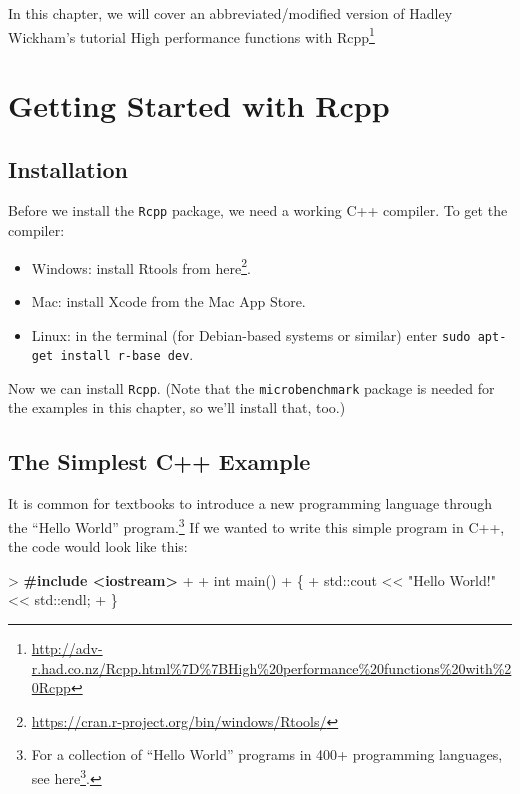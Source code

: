\documentclass[
]{krantz}
\makeatletter
\newenvironment{Shaded}{\begin{snugshade}}{\end{snugshade}}
\newcommand{\BuiltInTok}[1]{#1}
\newcommand{\DataTypeTok}[1]{\textcolor[rgb]{0.27,0.27,0.27}{#1}}
\newcommand{\ErrorTok}[1]{\textcolor[rgb]{0.14,0.14,0.14}{\textbf{#1}}}
\newcommand{\NormalTok}[1]{#1}
\newcommand{\StringTok}[1]{\textcolor[rgb]{0.5,0.5,0.5}{#1}}
\providecommand{\tightlist}{%
  \setlength{\itemsep}{0pt}\setlength{\parskip}{0pt}}
\renewcommand{\href}[2]{#2\footnote{\url{#1}}}
\newenvironment{kframe}{%
\medskip{}
\setlength{\fboxsep}{.8em}
 \def\at@end@of@kframe{}%
 \ifinner\ifhmode%
  \def\at@end@of@kframe{\end{minipage}}%
  \begin{minipage}{\columnwidth}%
 \fi\fi%
 \def\FrameCommand##1{\hskip\@totalleftmargin \hskip-\fboxsep
 \colorbox{shadecolor}{##1}\hskip-\fboxsep
     \hskip-\linewidth \hskip-\@totalleftmargin \hskip\columnwidth}%
 \MakeFramed {\advance\hsize-\width
   \@totalleftmargin\z@ \linewidth\hsize
   \@setminipage}}%
 {\par\unskip\endMakeFramed%
 \at@end@of@kframe}
\renewenvironment{Shaded}{\begin{kframe}}{\end{kframe}}
\makeatother
\begin{document}
In this chapter, we will cover an abbreviated/modified version of Hadley Wickham's tutorial \href{http://adv-r.had.co.nz/Rcpp.html\%7D\%7BHigh\%20performance\%20functions\%20with\%20Rcpp}{High performance functions with Rcpp}

\hypertarget{getting-started-with-rcpp}{%
\section{Getting Started with Rcpp}\label{getting-started-with-rcpp}}

\hypertarget{installation}{%
\subsection{Installation}\label{installation}}

Before we install the \texttt{Rcpp} package, we need a working C++ compiler. To get the compiler:

\begin{itemize}
\tightlist
\item
  Windows: install Rtools from \href{https://cran.r-project.org/bin/windows/Rtools/}{here}.
\item
  Mac: install Xcode from the Mac App Store.
\item
  Linux: in the terminal (for Debian-based systems or similar) enter
  \texttt{sudo\ apt-get\ install\ r-base\ dev}.
\end{itemize}

Now we can install \texttt{Rcpp}. (Note that the \texttt{microbenchmark} package is needed for the examples in this chapter, so we'll install that, too.)

\hypertarget{the-simplest-c-example}{%
\subsection{The Simplest C++ Example}\label{the-simplest-c-example}}

It is common for textbooks to introduce a new programming language through the ``Hello World'' program.\footnote{For a collection of ``Hello World'' programs in 400+ programming languages, see \href{https://helloworldcollection.github.io/}{here}.} If we wanted to write this simple program in C++, the code would look like this:

\begin{Shaded}
\begin{Highlighting}[]
\NormalTok{\textgreater{} }\ErrorTok{\#include \textless{}iostream\textgreater{}}
\NormalTok{+ }
\NormalTok{+ }\DataTypeTok{int}\NormalTok{ main()}
\NormalTok{+ \{}
\NormalTok{+     }\BuiltInTok{std::}\NormalTok{cout \textless{}\textless{} }\StringTok{"Hello World!"}\NormalTok{ \textless{}\textless{} }\BuiltInTok{std::}\NormalTok{endl;}
\NormalTok{+ \}}
\end{Highlighting}
\end{Shaded}
\end{document}
